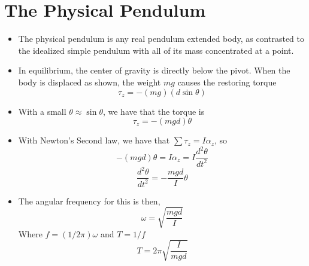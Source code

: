 \documentclass[11pt, a4paper]{article}
\begin{document}
\section{The Physical Pendulum}
\begin{itemize}
    \item The physical pendulum is any real pendulum extended body, as contrasted to the
        idealized simple pendulum with all of its mass concentrated at a point.
    \item In equilibrium, the center of gravity is directly below the pivot. When the body
        is displaced as shown, the weight $mg$ causes the restoring torque
        \begin{equation}
            \tau_{z} = -(mg)(d\sin\theta)
        \end{equation}
    \item With a small $\theta \approx \sin\theta$, we have that the torque is
        \begin{equation}
            \tau_{z} = -(mgd)\theta
        \end{equation}
    \item With Newton's Second law, we have that $\sum{}\tau_{z} = I\alpha_{z}$, so
        \begin{equation}
            -(mgd)\theta = I\alpha_{z} = I\frac{d^{2}\theta}{dt^{2}}
        \end{equation}
        \begin{equation}
            \frac{d^{2}\theta}{dt^{2}} = -\frac{mgd}{I}\theta
        \end{equation}
    \item The angular frequency for this is then,
        \begin{equation}
            \omega = \sqrt{\frac{mgd}{I}}
        \end{equation}
        Where $f = (1/2\pi)\omega$ and $T = 1/f$
        \begin{equation}
            T = 2\pi\sqrt{\frac{I}{mgd}}
        \end{equation}
\end{itemize}
\end{document}
